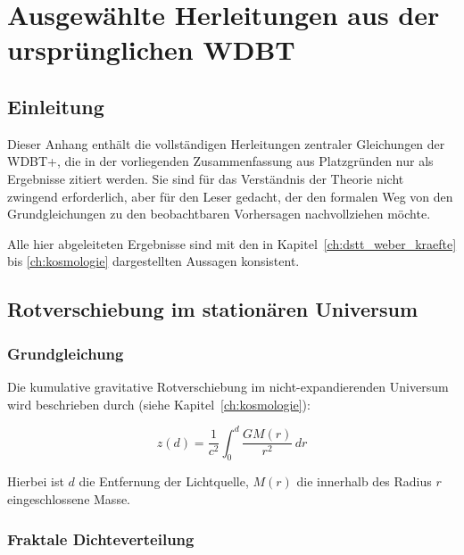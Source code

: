 
\chapter{Ausgewählte Herleitungen aus der ursprünglichen WDBT}
\label{app:herleitungen}

\section{Einleitung}
\label{app:herleitungen_einleitung}

Dieser Anhang enthält die vollständigen Herleitungen zentraler Gleichungen der WDBT+, die in der vorliegenden Zusammenfassung aus Platzgründen nur als Ergebnisse zitiert werden. Sie sind für das Verständnis der Theorie nicht zwingend erforderlich, aber für den Leser gedacht, der den formalen Weg von den Grundgleichungen zu den beobachtbaren Vorhersagen nachvollziehen möchte.

Alle hier abgeleiteten Ergebnisse sind mit den in Kapitel~\ref{ch:dstt_weber_kraefte} bis \ref{ch:kosmologie} dargestellten Aussagen konsistent.

\section{Rotverschiebung im stationären Universum}
\label{app:herleitungen_rotverschiebung}

\subsection{Grundgleichung}
\label{sub:herleitungen_rot_grund}

Die kumulative gravitative Rotverschiebung im nicht-expandierenden Universum wird beschrieben durch (siehe Kapitel~\ref{ch:kosmologie}):

\[
z(d) = \frac{1}{c^2} \int_0^d \frac{GM(r)}{r^2} \, dr \tag{D.1}
\]

Hierbei ist \( d \) die Entfernung der Lichtquelle, \( M(r) \) die innerhalb des Radius \( r \) eingeschlossene Masse.

\subsection{Fraktale Dichteverteilung}
\label{sub:herleitungen_rot_dichte}

